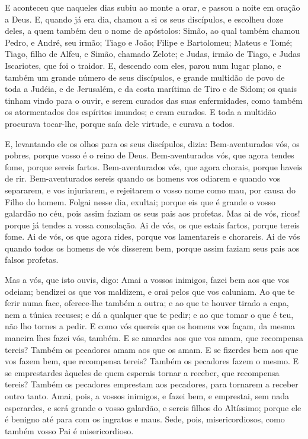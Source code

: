 E aconteceu que naqueles dias subiu ao monte a orar, e passou a
noite em oração a Deus. E, quando já era dia, chamou a si os
seus discípulos, e escolheu doze deles, a quem também deu o nome de
apóstolos: Simão, ao qual também chamou Pedro, e André, seu
irmão; Tiago e João; Filipe e Bartolomeu; Mateus e Tomé;
Tiago, filho de Alfeu, e Simão, chamado Zelote; e Judas,
irmão de Tiago, e Judas Iscariotes, que foi o traidor. E,
descendo com eles, parou num lugar plano, e também um grande número
de seus discípulos, e grande multidão de povo de toda a Judéia, e de
Jerusalém, e da costa marítima de Tiro e de Sidom; os quais tinham
vindo para o ouvir, e serem curados das suas enfermidades,
como também os atormentados dos espíritos imundos; e eram
curados. E toda a multidão procurava tocar-lhe, porque saía
dele virtude, e curava a todos.

E, levantando ele os olhos para os seus discípulos, dizia:
Bem-aventurados vós, os pobres, porque vosso é o reino de Deus.
Bem-aventurados vós, que agora tendes fome, porque sereis
fartos. Bem-aventurados vós, que agora chorais, porque haveis de
rir. Bem-aventurados sereis quando os homens vos odiarem e
quando vos separarem, e vos injuriarem, e rejeitarem o vosso nome
como mau, por causa do Filho do homem. Folgai nesse dia,
exultai; porque eis que é grande o vosso galardão no céu, pois assim
faziam os seus pais aos profetas. Mas ai de vós, ricos!
porque já tendes a vossa consolação. Ai de vós, os que estais
fartos, porque tereis fome. Ai de vós, os que agora rides, porque
vos lamentareis e chorareis. Ai de vós quando todos os homens
de vós disserem bem, porque assim faziam seus pais aos falsos
profetas.

Mas a vós, que isto ouvis, digo: Amai a vossos inimigos, fazei
bem aos que vos odeiam; bendizei os que vos maldizem, e orai
pelos que vos caluniam. Ao que te ferir numa face,
oferece-lhe também a outra; e ao que te houver tirado a capa, nem a
túnica recuses; e dá a qualquer que te pedir; e ao que tomar
o que é teu, não lho tornes a pedir. E como vós quereis que
os homens vos façam, da mesma maneira lhes fazei vós, também.
E se amardes aos que vos amam, que recompensa tereis? Também
os pecadores amam aos que os amam. E se fizerdes bem aos que
vos fazem bem, que recompensa tereis? Também os pecadores fazem o
mesmo. E se emprestardes àqueles de quem esperais tornar a
receber, que recompensa tereis? Também os pecadores emprestam aos
pecadores, para tornarem a receber outro tanto. Amai, pois, a
vossos inimigos, e fazei bem, e emprestai, sem nada esperardes, e
será grande o vosso galardão, e sereis filhos do Altíssimo; porque
ele é benigno até para com os ingratos e maus. Sede, pois,
misericordiosos, como também vosso Pai é misericordioso.

